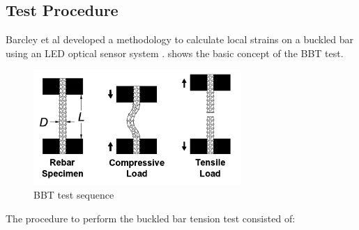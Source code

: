 \subsection{Test Procedure}
Barcley et al \cite{Barcley2019} developed a methodology to calculate local strains on a buckled bar using an LED optical sensor system \cite{NorthernDigitalInc.2020}.  shows the basic concept of the BBT test.

\begin{figure}[htbp]
	\centering
	\includegraphics[width=0.7\textwidth]{Chapter-3/figs/BBT_Sequence}
	\caption{BBT test sequence\cite{Barcley2019}}
	\label{fig:BBTseq}
\end{figure}

The procedure to perform the buckled bar tension test consisted of:

